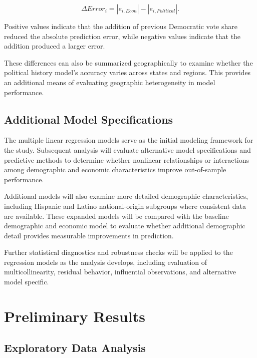 \documentclass[12pt]{article}
\begin{document}
	\begin{equation}
		\Delta Error_i
		=
		|e_{i,Econ}|
		-
		|e_{i,Political}|.
	\end{equation}
	
	Positive values indicate that the addition of previous Democratic vote
	share reduced the absolute prediction error, while negative values
	indicate that the addition produced a larger
	error.
	
	These differences can also be summarized geographically to examine
	whether the political history model's accuracy varies across states and
	regions. This provides an additional means of evaluating geographic
	heterogeneity in model performance.
	
	\subsection{Additional Model Specifications}
	
	The multiple linear regression models serve as the initial modeling
	framework for the study. Subsequent analysis will evaluate alternative
	model specifications and predictive methods to determine whether
	nonlinear relationships or interactions among demographic and economic
	characteristics improve out-of-sample performance.
	
	Additional models will also examine more detailed demographic
	characteristics, including Hispanic and Latino national-origin
	subgroups where consistent data are available. These expanded
	models will be compared with the baseline demographic and
	economic model to evaluate whether additional demographic detail
	provides measurable improvements in prediction.
	
	Further statistical diagnostics and robustness checks will be applied
	to the regression models as the analysis develops, including
	evaluation of multicollinearity, residual behavior, influential
	observations, and alternative model specific.
	
	
	
	\section{Preliminary Results}
	
	\subsection{Exploratory Data Analysis}
	
\end{document}
